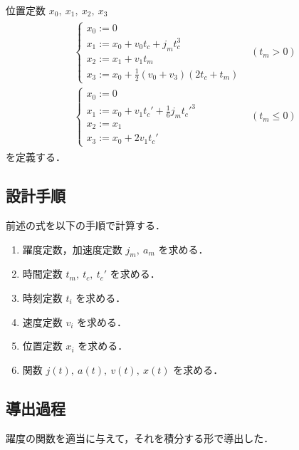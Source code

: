 \documentclass[a5paper]{ltjsarticle}
\begin{document}
位置定数 $x_0,~x_1,~x_2,~x_3$
\begin{align}
    \begin{array}{ll}
        \left\{ \begin{array}{l}
            x_0 := 0                         \\
            x_1 := x_0 + v_0 t_c + j_m t_c^3 \\
            x_2 := x_1 + v_1 t_m             \\
            x_3 := x_0 + \frac{1}{2} (v_0+v_3) (2t_c+t_m)
        \end{array} \right.
         &
        (t_m > 0)
        \\
        \left\{ \begin{array}{l}
            x_0 := 0                                       \\
            x_1 := x_0 + v_1 t_c' + \frac{1}{6} j_m t_c'^3 \\
            x_2 := x_1                                     \\
            x_3 := x_0 + 2 v_1 t_c'
        \end{array} \right.
         &
        (t_m \leq 0)
    \end{array}
\end{align}
を定義する．

\subsection{設計手順}
前述の式を以下の手順で計算する．
\begin{enumerate}
    \item 躍度定数，加速度定数 $j_m,~a_m$ を求める．
    \item 時間定数 $t_m,~t_c,~t_c'$ を求める．
    \item 時刻定数 $t_i$ を求める．
    \item 速度定数 $v_i$ を求める．
    \item 位置定数 $x_i$ を求める．
    \item 関数 $j(t),~ a(t),~ v(t),~ x(t)$ を求める．
\end{enumerate}

\subsection{導出過程}
躍度の関数を適当に与えて，それを積分する形で導出した．
\end{document}
